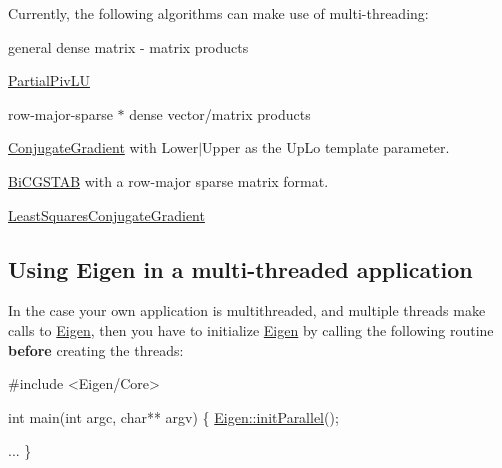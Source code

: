 Currently, the following algorithms can make use of multi-\/threading\+:
\begin{DoxyItemize}
\item general dense matrix -\/ matrix products
\item \hyperlink{group___l_u___module_class_eigen_1_1_partial_piv_l_u}{Partial\+Piv\+LU}
\item row-\/major-\/sparse $\ast$ dense vector/matrix products
\item \hyperlink{group___iterative_linear_solvers___module_class_eigen_1_1_conjugate_gradient}{Conjugate\+Gradient} with {\ttfamily Lower$\vert$\+Upper} as the {\ttfamily Up\+Lo} template parameter.
\item \hyperlink{group___iterative_linear_solvers___module_class_eigen_1_1_bi_c_g_s_t_a_b}{Bi\+C\+G\+S\+T\+AB} with a row-\/major sparse matrix format.
\item \hyperlink{group___iterative_linear_solvers___module_class_eigen_1_1_least_squares_conjugate_gradient}{Least\+Squares\+Conjugate\+Gradient}
\end{DoxyItemize}\hypertarget{_topic_multi_threading_TopicMultiThreading_UsingEigenWithMT}{}\subsection{Using Eigen in a multi-\/threaded application}\label{_topic_multi_threading_TopicMultiThreading_UsingEigenWithMT}
In the case your own application is multithreaded, and multiple threads make calls to \hyperlink{namespace_eigen}{Eigen}, then you have to initialize \hyperlink{namespace_eigen}{Eigen} by calling the following routine {\bfseries before} creating the threads\+: 
\begin{DoxyCode}
\textcolor{preprocessor}{#include <Eigen/Core>}

\textcolor{keywordtype}{int} main(\textcolor{keywordtype}{int} argc, \textcolor{keywordtype}{char}** argv)
\{
  \hyperlink{namespace_eigen_a820c0e0460934cc17eb6dacbad54a9f5}{Eigen::initParallel}();
  
  ...
\}
\end{DoxyCode}


